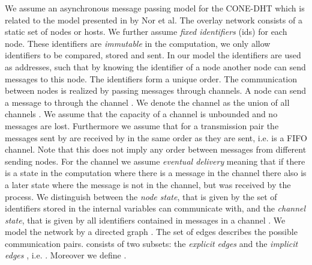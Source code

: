 \documentclass[11pt]{article}
\begin{document}
We assume an asynchronous message passing model for the CONE-DHT which is
related to the model presented in \cite{NNS11:corona} by Nor et al. The
overlay network consists of a static set  of  nodes or hosts. We further
assume \emph{fixed identifiers} (ids) for each node. These identifiers are
\emph{immutable} in the computation, we only allow identifiers to be compared,
stored and sent. In our model the identifiers are used as addresses, such that
by knowing the identifier of a node another node can send messages to this
node. The identifiers form a unique order. The communication between nodes is
realized by passing messages through channels. A node  can send a message
to  through the channel . We denote the channel  as the
union of all channels . We assume that the capacity of a channel is
unbounded and no messages are lost. Furthermore we assume that for a
transmission pair  the messages sent by  are received by  in the
same order as they are sent, i.e.  is a FIFO channel. Note that this
does not imply any order between messages from different sending nodes. For
the channel we assume \emph{eventual delivery} meaning that if there is a
state in the computation where there is a message in the channel  there
also is a later state where the message is not in the channel, but was
received by the process. We distinguish between the \emph{node state}, that is
given by the set of identifiers stored in the internal variables  can communicate with, and the \emph{channel state}, that is
given by all identifiers contained in messages in a channel . We
model the network by a directed graph . The set of edges
 describes the possible communication pairs.  consists of two subsets:
the \emph{explicit edges}  and the \emph{implicit edges}
, i.e.
. Moreover we define .
\end{document}
